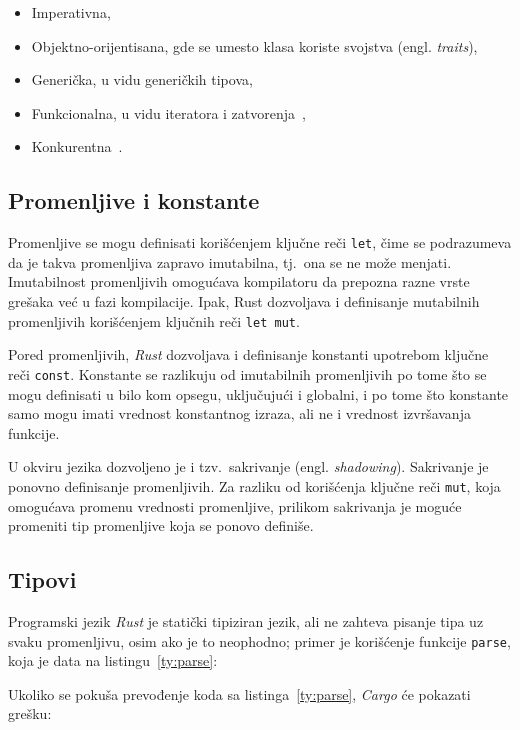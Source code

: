 \documentclass[12pt,oneside]{memoir}
\begin{document}
\begin{itemize}
    \item Imperativna,
    \item Objektno-orijentisana, gde se umesto klasa koriste svojstva (engl. \emph{traits}),
    \item Generička, u vidu generičkih tipova,
    \item Funkcionalna, u vidu iteratora i zatvorenja~\cite{functional_rust},
    \item Konkurentna~\cite{concurrent_rust}.
\end{itemize}

\subsection{Promenljive i konstante}
Promenljive se mogu definisati korišćenjem ključne reči \texttt{let}, čime se podrazumeva da
je takva promenljiva zapravo imutabilna, tj.\ ona se ne može menjati. Imutabilnost
promenljivih omogućava kompilatoru da prepozna razne vrste grešaka već u fazi kompilacije.
Ipak, Rust dozvoljava i definisanje mutabilnih promenljivih korišćenjem ključnih reči \texttt{let mut}.

Pored promenljivih, \emph{Rust} dozvoljava i definisanje konstanti
upotrebom ključne reči \texttt{const}.
Konstante se razlikuju od imutabilnih promenljivih po tome što se
mogu definisati u bilo kom opsegu, uključujući i globalni, i po
tome što konstante samo mogu imati vrednost konstantnog izraza,
ali ne i vrednost izvršavanja funkcije.

U okviru jezika dozvoljeno je i tzv.\ sakrivanje (engl. \emph{shadowing}).
Sakrivanje je ponovno definisanje promenljivih. Za razliku od
korišćenja ključne reči \texttt{mut}, koja omogućava promenu vrednosti promenljive, prilikom sakrivanja je
moguće promeniti tip promenljive koja se ponovo definiše.

\subsection{Tipovi}
Programski jezik \emph{Rust} je statički tipiziran jezik, ali
ne zahteva pisanje tipa uz svaku promenljivu, osim ako je to
neophodno; primer je korišćenje funkcije \texttt{parse}, koja je data na listingu~\ref{ty:parse}:



\noindent
Ukoliko se pokuša prevođenje koda sa listinga~\ref{ty:parse}, \emph{Cargo} će
pokazati grešku:
\end{document}
